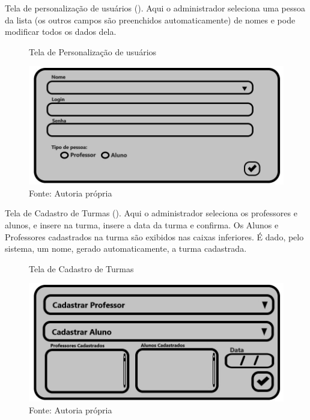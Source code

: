 \documentclass{utfpr-pg}
\begin{document}
        Tela de personalização de usuários (). Aqui o administrador seleciona uma pessoa da lista (os outros campos são preenchidos automaticamente) de nomes e pode modificar todos os dados dela.
        \begin{figure}[H]
            \centering
            \captionsetup{width=0.9\textwidth}
            \caption{Tela de Personalização de usuários}
            \includegraphics[width=\linewidth]{fotos/13.2.jpg}
            \caption*{Fonte: Autoria própria}
            \label{fig:13.2}
        \end{figure}
        
        Tela de Cadastro de Turmas (). Aqui o administrador seleciona os professores e alunos, e insere na turma, insere a data da turma e confirma. Os Alunos e Professores cadastrados na turma são exibidos nas caixas inferiores. É dado, pelo sistema, um nome, gerado automaticamente, a turma cadastrada.
        
        \begin{figure}[H]
            \centering
            \captionsetup{width=0.9\textwidth}
            \caption{Tela de Cadastro de Turmas}
            \includegraphics[width=\linewidth]{fotos/14.jpg}
            \caption*{Fonte: Autoria própria}
            \label{fig:14}
        \end{figure}
        
\end{document}
